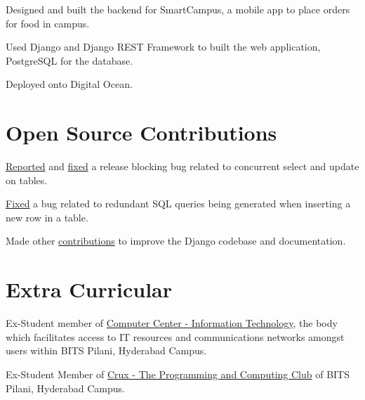 \documentclass[]{resume}
\begin{document}
\begin{minipage}[t]{0.70\textwidth}
\begin{tightemize}
 \item Designed and built the backend for SmartCampus, a mobile app to place orders for food in campus.
 \item Used Django and Django REST Framework to built the web application, PostgreSQL for the database.
 \item Deployed onto Digital Ocean.
\end{tightemize}
\primarysectionsep  %

\section{Open Source Contributions}
\begin{tightemize}
\item \href{https://code.djangoproject.com/ticket/31246}{Reported} and \href{https://github.com/django/django/pull/12434}{fixed}
a release blocking bug related to concurrent select and update on tables.
\item \justifying\href{https://github.com/django/django/pull/12496}{Fixed} a bug related to redundant SQL queries being generated when
inserting a new row in a table.
\item \justifying Made other \href{https://github.com/django/django/pulls?q=author\%3Aabhijeetviswa}{contributions} to improve the Django codebase and
documentation.
\end{tightemize}
\primarysectionsep

\subsectionsep %
\section{Extra Curricular}
\vspace{\itemsep}
\begin{tightemize}
\item Ex-Student member of \href{https://universe.bits-pilani.ac.in/Hyderabad/Computercentre}{Computer Center - Information Technology},
the body which facilitates access to IT resources and communications networks amongst users within BITS Pilani, Hyderabad Campus.
\item Ex-Student Member of \href{https://crux-bphc.github.io}{Crux - The Programming and Computing Club} of BITS Pilani, Hyderabad Campus.
\end{tightemize}
\end{minipage}
\end{document}
